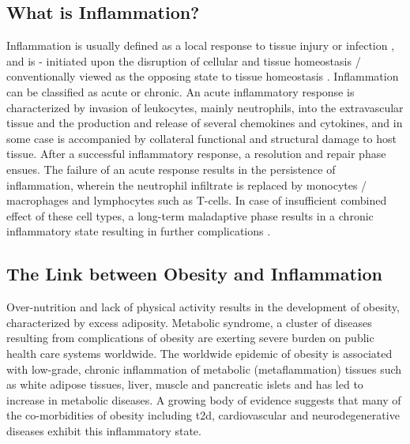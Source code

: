 




    

\subsection{What is Inflammation?}
\label{sec:immune_inflammation}

\par Inflammation is usually defined as a local response to tissue injury or infection \textbf{\cite{donath_islet_2008}}, and is - initiated upon the disruption of cellular and tissue homeostasis / conventionally viewed as the opposing state to tissue homeostasis \textbf{\cite{meizlish_tissue_2021}}. Inflammation can be classified as acute or chronic. An acute inflammatory response is characterized by invasion of leukocytes, mainly neutrophils, into the extravascular tissue and the production and release of several chemokines and cytokines, and in some case is accompanied by collateral functional and structural damage to host tissue. After a successful inflammatory response, a resolution and repair phase ensues. The failure of an acute response results in the persistence of inflammation, wherein the neutrophil infiltrate is replaced by monocytes / macrophages and lymphocytes such as T-cells. In case of insufficient combined effect of these cell types, a long-term maladaptive phase results in a chronic inflammatory state resulting in further complications \textbf{\cite{medzhitov_origin_2008}}. 

\subsection{The Link between Obesity and Inflammation}
\label{sec:immune_obesity}

Over-nutrition and lack of physical activity results in the development of obesity, characterized by excess adiposity. Metabolic syndrome, a cluster of diseases resulting from complications of obesity are exerting severe burden on public health care systems worldwide. The worldwide epidemic of obesity is associated with low-grade, chronic inflammation of metabolic (metaflammation) tissues such as white adipose tissues, liver, muscle and pancreatic islets and has led to increase in metabolic diseases. A growing body of evidence suggests that many of the co-morbidities of obesity including \gls{t2d}, cardiovascular and neurodegenerative diseases exhibit this inflammatory state.\\

